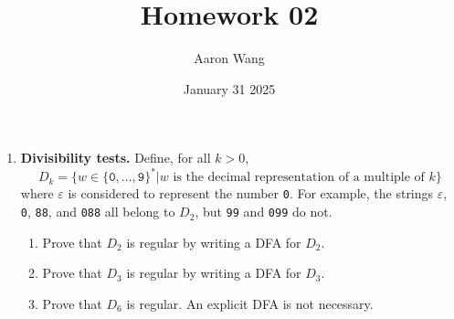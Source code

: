 \documentclass{article}
\title{Homework 02}
\author{Aaron Wang}
\date{January 31 2025}
\newcommand{\e}{\varepsilon}
\newcommand{\newp}{\\[2mm]}
\begin{document}
\maketitle
\begin{enumerate}
    \item \textbf{Divisibility tests.} Define, for all $k > 0$,
    \[
        D_k = \Big\{w \in \{\texttt{0}, . . . , \texttt{9}\}^*| w \text{ is the decimal representation of a multiple of } k \Big\}
    \]
    where $\e$ is considered to represent the number \texttt{0}. For example, the strings $\e$, \texttt{0}, \texttt{88}, and \texttt{088} all belong to $D_2$, but \texttt{99} and \texttt{099} do not.
    \begin{enumerate}
        \item Prove that $D_2$ is regular by writing a DFA for $D_2$.\newp
        
        \item Prove that $D_3$ is regular by writing a DFA for $D_3$.\newp
        
        \item Prove that $D_6$ is regular. An explicit DFA is not necessary.\newp
        


\end{enumerate}
\end{enumerate}
\end{document}
